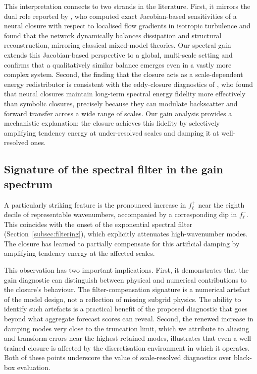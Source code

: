 This interpretation connects to two strands in the literature. First, it mirrors the dual role reported by \citet{Portwood2021}, who computed exact Jacobian-based sensitivities of a neural closure with respect to localised flow gradients in isotropic turbulence and found that the network dynamically balances dissipation and structural reconstruction, mirroring classical mixed-model theories. Our spectral gain extends this Jacobian-based perspective to a global, multi-scale setting and confirms that a qualitatively similar balance emerges even in a vastly more complex system. Second, the finding that the closure acts as a scale-dependent energy redistributor is consistent with the eddy-closure diagnostics of \citet{ross2023benchmarking}, who found that neural closures maintain long-term spectral energy fidelity more effectively than symbolic closures, precisely because they can modulate backscatter and forward transfer across a wide range of scales. Our gain analysis provides a mechanistic explanation: the closure achieves this fidelity by selectively amplifying tendency energy at under-resolved scales and damping it at well-resolved ones.

\subsection{Signature of the spectral filter in the gain spectrum}

A particularly striking feature is the pronounced increase in $f^{+}_\ell$ near the eighth decile of representable wavenumbers, accompanied by a corresponding dip in $f^{-}_\ell$. This coincides with the onset of the exponential spectral filter (Section~\ref{subsec:filtering}), which explicitly attenuates high-wavenumber modes. The closure has learned to partially compensate for this artificial damping by amplifying tendency energy at the affected scales.

This observation has two important implications. First, it demonstrates that the gain diagnostic can distinguish between physical and numerical contributions to the closure's behaviour. The filter-compensation signature is a numerical artefact of the model design, not a reflection of missing subgrid physics. The ability to identify such artefacts is a practical benefit of the proposed diagnostic that goes beyond what aggregate forecast scores can reveal. Second, the renewed increase in damping modes very close to the truncation limit, which we attribute to aliasing and transform errors near the highest retained modes, illustrates that even a well-trained closure is affected by the discretisation environment in which it operates. Both of these points underscore the value of scale-resolved diagnostics over black-box evaluation.


